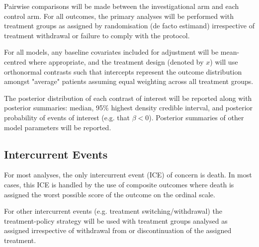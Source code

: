 \documentclass[11pt,parskip=half-]{scrartcl}
\begin{document}
Pairwise comparisons will be made between the investigational arm and each control arm. For all outcomes, the primary analyses will be performed with treatment groups as assigned by randomisation (de facto estimand) irrespective of treatment withdrawal or failure to comply with the protocol.

For all models, any baseline covariates included for adjustment will be mean-centred where appropriate, and the treatment design (denoted by $x$) will use orthonormal contrasts such that intercepts represent the outcome distribution amongst "average" patients assuming equal weighting across all treatment groups.

The posterior distribution of each contrast of interest will be reported along with posterior summaries: median, 95\% highest density credible interval, and posterior probability of events of interest (e.g. that $\beta < 0$). Posterior summaries of other model parameters will be reported.


\subsection{Intercurrent Events}

For most analyses, the only intercurrent event (ICE) of concern is death. In most cases, this ICE is handled by the use of composite outcomes where death is assigned the worst possible score of the outcome on the ordinal scale.

For other intercurrent events (e.g. treatment switching/withdrawal) the treatment-policy strategy will be used with treatment groups analysed as assigned irrespective of withdrawal from or discontinuation of the assigned treatment.
\end{document}
